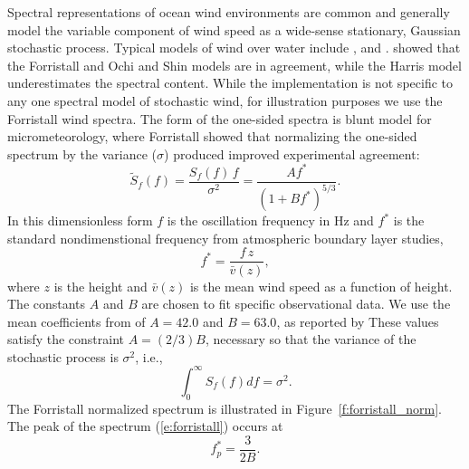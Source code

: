 \documentclass[11pt]{article}
\begin{document}
Spectral representations of ocean wind environments are common and generally model the variable component of wind speed as a wide-sense stationary, Gaussian stochastic process.  Typical models of wind over water include \citet{harris71nature}, \citet{forristall88wind} and \citet{ochi13wind}. \citet{cole18reactive} showed that the Forristall and Ochi and Shin models are in agreement, while the Harris model underestimates the spectral content.  While the implementation is not specific to any one spectral model of stochastic wind, for illustration purposes we use the Forristall wind spectra.  The form of the one-sided spectra is \citet{olesen84modelling} blunt model for micrometeorology, where Forristall showed that normalizing the one-sided spectrum by the variance ($\sigma$) produced improved experimental agreement:
\begin{equation}
  \widetilde{S}_f(f) = \frac{S_f(f)\,f}{\sigma^2}  = \frac{ A f^*}{( 1 + B f^*)^{5/3}}.
    \label{e:forristall}
    \end{equation}
    In this dimensionless form $f$ is the oscillation frequency in \unit[]{Hz} and $f^*$ is the standard nondimenstional frequency from atmospheric boundary layer studies,
\begin{equation}
  f^* = \frac{f \, z}{\bar{v}(z)},
\end{equation}
where $z$ is the height and $\bar{v}(z)$ is the mean wind speed as a function of height. The constants $A$ and $B$ are chosen to fit specific observational data.  We use the mean coefficients from of $A=42.0$ and $B=63.0$, as reported by \citet{forristall88wind}  These values satisfy the constraint $A=(2/3)B$, necessary so that the variance of the stochastic process is $\sigma^2$, i.e.,
\begin{equation}
  \int_0^{\infty} S_f(f) df = \sigma^2.
\end{equation}
The Forristall normalized spectrum is illustrated in Figure~\ref{f:forristall_norm}.   The peak of the spectrum (\ref{e:forristall}) occurs at
\begin{equation}
f^*_p = \frac{3}{2B}.
\end{equation}
\end{document}
